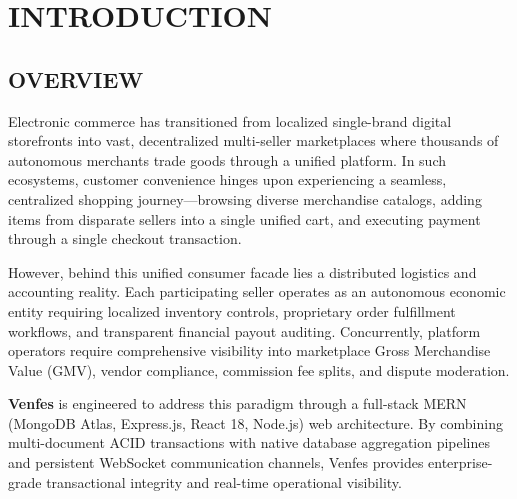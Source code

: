 \documentclass[12pt,a4paper]{report}
\begin{document}
\newpage
\tableofcontents

\newpage
\listoffigures

\newpage
\listoftables

\newpage
{}
\setcounter{page}{1}

\chapter{INTRODUCTION}

\section{OVERVIEW}
Electronic commerce has transitioned from localized single-brand digital storefronts into vast, decentralized multi-seller marketplaces where thousands of autonomous merchants trade goods through a unified platform. In such ecosystems, customer convenience hinges upon experiencing a seamless, centralized shopping journey---browsing diverse merchandise catalogs, adding items from disparate sellers into a single unified cart, and executing payment through a single checkout transaction.

However, behind this unified consumer facade lies a distributed logistics and accounting reality. Each participating seller operates as an autonomous economic entity requiring localized inventory controls, proprietary order fulfillment workflows, and transparent financial payout auditing. Concurrently, platform operators require comprehensive visibility into marketplace Gross Merchandise Value (GMV), vendor compliance, commission fee splits, and dispute moderation.

\textbf{Venfes} is engineered to address this paradigm through a full-stack MERN (MongoDB Atlas, Express.js, React 18, Node.js) web architecture. By combining multi-document ACID transactions with native database aggregation pipelines and persistent WebSocket communication channels, Venfes provides enterprise-grade transactional integrity and real-time operational visibility.
\end{document}
